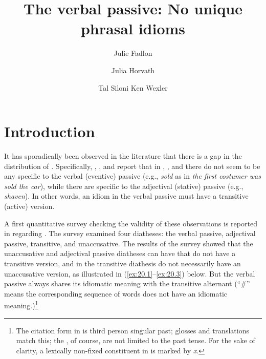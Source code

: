 \documentclass[output=paper]{langsci/langscibook}
\author{Julie Fadlon\affiliation{Tel Aviv University}\and
        Julia Horvath\affiliation{Tel Aviv University}\and
        Tal Siloni\affiliation{Tel Aviv University}\lastand
        Ken Wexler\affiliation{Massachusetts Institute of Technology}}
\title{The verbal passive: No unique phrasal idioms}
\begin{document}
\glsresetall

\section{Introduction}

It has sporadically been observed in the literature that there is a gap in the
distribution of . Specifically, \citet{DubSim1996}, \citet{Marantz1997},
and \textcite{Ruwet1991} report that in , , and
 there do not seem to be any  specific to
the verbal (eventive) passive (e.g., \emph{sold} as in \textit{the first costumer was
sold the car}), while there are  specific to the adjectival (stative)
passive (e.g., \emph{shaven}). In other words, an idiom in the verbal passive
must have a transitive (active) version.

A first quantitative survey checking the validity of these observations is
reported in \citet{HorSil2009} regarding . The survey examined four
diatheses: the verbal passive, adjectival passive, transitive, and
unaccusative. The results of the survey showed that the unaccusative and
adjectival passive diatheses can have  that do not have a transitive
version, and  in the transitive diathesis do not necessarily have an
unaccusative version, as illustrated in (\ref{ex:20.1}--\ref{ex:20.3}) below. But the verbal passive
always shares its idiomatic meaning with the transitive alternant (``\#'' means the
corresponding sequence of words does not have an idiomatic
meaning.)\footnote{The citation form in  is third person singular
    past; glosses and translations match this; the , of course, are not
    limited to the past tense. For the sake of clarity, a lexically non-fixed
    constituent in   is marked by \emph{x}.}\largerpage[2]
\end{document}
